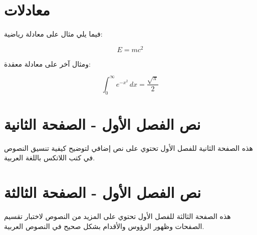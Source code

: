 \section{معادلات}
فيما يلي مثال على معادلة رياضية:

\begin{equation}
    E = mc^2
\end{equation}

ومثال آخر على معادلة معقدة:

\begin{equation}
    \int_0^\infty e^{-x^2} \, dx = \frac{\sqrt{\pi}}{2}
\end{equation}

\newpage

\section{نص الفصل الأول - الصفحة الثانية}

هذه الصفحة الثانية للفصل الأول تحتوي على نص إضافي لتوضيح كيفية تنسيق النصوص في كتب اللاتكس باللغة العربية.

\newpage

\section{نص الفصل الأول - الصفحة الثالثة}

هذه الصفحة الثالثة للفصل الأول تحتوي على المزيد من النصوص لاختبار تقسيم الصفحات وظهور الرؤوس والأقدام بشكل صحيح في النصوص العربية.
